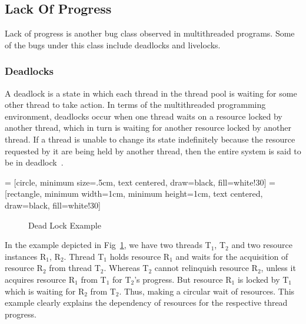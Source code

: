 \subsection{Lack Of Progress}

Lack of progress is another bug class observed in multithreaded programs. 
Some of the bugs under this class include deadlocks and livelocks. 

\subsubsection{Deadlocks}

A deadlock is a state in which each thread in the thread pool is waiting for some other thread to take action. 
In terms of the multithreaded programming environment, deadlocks occur when one thread waits on a resource locked by another thread, which in turn is waiting for another resource locked by another thread. 
If a thread is unable to change its state indefinitely because the resource requested by it are being held by another thread, then the entire system is said to be in deadlock~\citep{chaki2005concurrent}. 

 = [circle, minimum size=.5cm, text centered, draw=black, fill=white!30]
 = [rectangle, minimum width=1cm, minimum height=1cm, text centered, draw=black, fill=white!30]

\begin{figure}[h]
\centering
{}
\caption{Dead Lock Example}
\label{deadlock_example}
\end{figure}

In the example depicted in Fig~\ref{deadlock_example}, we have two threads T$_1$, T$_2$ and two resource instances R$_1$, R$_2$. 
Thread T$_1$ holds resource R$_1$ and waits for the acquisition of resource R$_2$ from thread T$_2$. 
Whereas T$_2$ cannot relinquish resource R$_2$, unless it acquires resource R$_1$ from T$_1$ for T$_2$'s progress. 
But resource R$_1$ is locked by T$_1$ which is waiting for R$_2$ from T$_2$. 
Thus, making a circular wait of resources. 
This example clearly explains the dependency of resources for the respective thread progress. 

